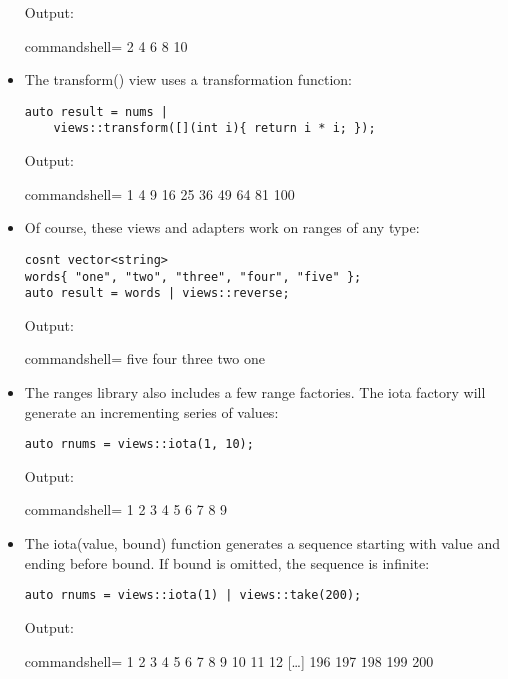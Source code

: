 \begin{itemize}
Output:

\begin{tcblisting}{commandshell={}}
2 4 6 8 10
\end{tcblisting}

\item 
The transform() view uses a transformation function:

\begin{lstlisting}[style=styleCXX]
auto result = nums |
	views::transform([](int i){ return i * i; });
\end{lstlisting}

Output:

\begin{tcblisting}{commandshell={}}
1 4 9 16 25 36 49 64 81 100
\end{tcblisting}

\item 
Of course, these views and adapters work on ranges of any type:

\begin{lstlisting}[style=styleCXX]
cosnt vector<string>
words{ "one", "two", "three", "four", "five" };
auto result = words | views::reverse;
\end{lstlisting}

Output:

\begin{tcblisting}{commandshell={}}
five four three two one
\end{tcblisting}

\item 
The ranges library also includes a few range factories. The iota factory will generate an incrementing series of values:

\begin{lstlisting}[style=styleCXX]
auto rnums = views::iota(1, 10);
\end{lstlisting}

Output:

\begin{tcblisting}{commandshell={}}
1 2 3 4 5 6 7 8 9
\end{tcblisting}

\item 
The iota(value, bound) function generates a sequence starting with value and ending before bound. If bound is omitted, the sequence is infinite:

\begin{lstlisting}[style=styleCXX]
auto rnums = views::iota(1) | views::take(200);
\end{lstlisting}

Output:

\begin{tcblisting}{commandshell={}}
1 2 3 4 5 6 7 8 9 10 11 12 […] 196 197 198 199 200
\end{tcblisting}
\end{itemize}

